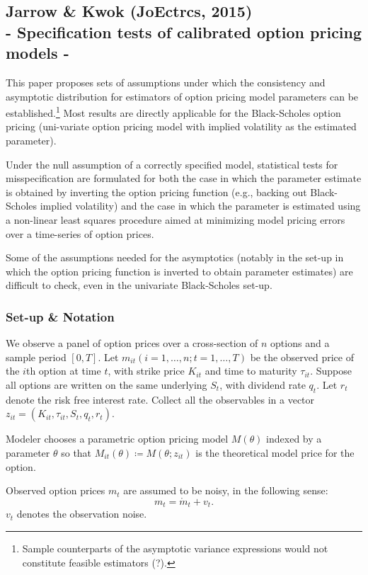 \documentclass[11pt,a4paper,notitlepage]{article}
\numberwithin{equation}{section}
\begin{document}
\subsection{Jarrow \& Kwok (JoEctrcs, 2015) \\ - Specification tests of calibrated option pricing models -}

This paper proposes sets of assumptions under which the consistency and asymptotic distribution for estimators of option pricing model parameters can be established.\footnote{Sample counterparts of the asymptotic variance expressions would not constitute feasible estimators (?).} Most results are directly applicable for the Black-Scholes option pricing (uni-variate option pricing model with implied volatility as the estimated parameter). 

Under the null assumption of a correctly specified model, statistical tests for misspecification are formulated for both the case in which the parameter estimate is obtained by inverting the option pricing function (e.g., backing out Black-Scholes implied volatility) and the case in which the parameter is estimated using a non-linear least squares procedure aimed at minimizing model pricing errors over a time-series of option prices.

Some of the assumptions needed for the asymptotics (notably in the set-up in which the option pricing function is inverted to obtain parameter estimates) are difficult to check, even in the univariate Black-Scholes set-up. 

\subsubsection{Set-up \& Notation}
We observe a panel of option prices over a cross-section of $n$ options and a sample period $[0,T]$. Let $m_{it} (i=1,\dots,n; t=1,\dots,T)$ be the observed price of the $i$th option at time $t$, with strike price $K_{it}$ and time to maturity $\tau_{it}$. Suppose all options are written on the same underlying $S_t$, with dividend rate $q_t$. Let $r_t$ denote the risk free interest rate. 
Collect all the observables in a vector $z_{it}=\left(K_{it},\tau_{it},S_t,q_t,r_t\right)$.  

Modeler chooses a parametric option pricing model $M(\theta)$ indexed by a parameter $\theta$ so that $M_{it}(\theta)\coloneqq M(\theta;z_{it})$ is the theoretical model price for the option. 

Observed option prices $m_t$ are assumed to be noisy, in the following sense:
\begin{equation}
m_t = \mathring{m}_t+v_t.
\end{equation}
$v_t$ denotes the observation noise. 
\end{document}
